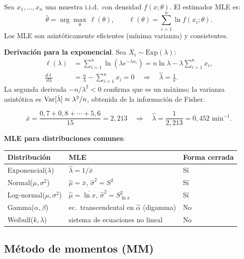 \documentclass[11pt, letterpaper]{article}
\begin{document}
Sea $x_1,\ldots,x_n$ una muestra i.i.d.\ con densidad $f(x;\theta)$. El estimador MLE es:
\[
\hat\theta = \arg\max_\theta\, \ell(\theta), \qquad \ell(\theta) = \sum_{i=1}^{n}\ln f(x_i;\theta).
\]
Los MLE son asintóticamente eficientes (mínima varianza) y consistentes.

\textbf{Derivación para la exponencial}. Sea $X_i \sim \text{Exp}(\lambda)$:
\begin{align*}
\ell(\lambda) &= \sum_{i=1}^n \ln(\lambda e^{-\lambda x_i}) = n\ln\lambda - \lambda\sum_{i=1}^n x_i, \\
\frac{d\ell}{d\lambda} &= \frac{n}{\lambda} - \sum_{i=1}^n x_i = 0
\quad\Rightarrow\quad \hat\lambda = \frac{1}{\bar x}.
\end{align*}
La segunda derivada $-n/\lambda^2 < 0$ confirma que es un máximo; la varianza asintótica es $\operatorname{Var}[\hat\lambda] \approx \lambda^2/n$, obtenida de la información de Fisher.

\begin{ejemplobox}
\[
\bar x = \frac{0{,}7+0{,}8+\cdots+5{,}6}{15} = 2{,}213
\quad\Rightarrow\quad
\hat\lambda = \frac{1}{2{,}213} = 0{,}452 \text{ min}^{-1}.
\]
\end{ejemplobox}

\textbf{MLE para distribuciones comunes}:

\begin{center}
\small
\renewcommand{\arraystretch}{1.4}
\begin{tabular}{lll}
\toprule
\textbf{Distribución} & \textbf{MLE} & \textbf{Forma cerrada} \\
\midrule
Exponencial($\lambda$)          & $\hat\lambda = 1/\bar{x}$                          & Sí \\
Normal($\mu,\sigma^2$)          & $\hat\mu=\bar{x}$,\; $\hat\sigma^2=S^2$            & Sí \\
Log-normal($\mu,\sigma^2$)      & $\hat\mu=\overline{\ln x}$,\; $\hat\sigma^2=S^2_{\ln x}$ & Sí \\
Gamma($\alpha,\beta$)           & ec.\ transcendental en $\hat\alpha$ (digamma)       & No \\
Weibull($k,\lambda$)            & sistema de ecuaciones no lineal                     & No \\
\bottomrule
\end{tabular}
\end{center}

\subsection{Método de momentos (MM)}
\end{document}
